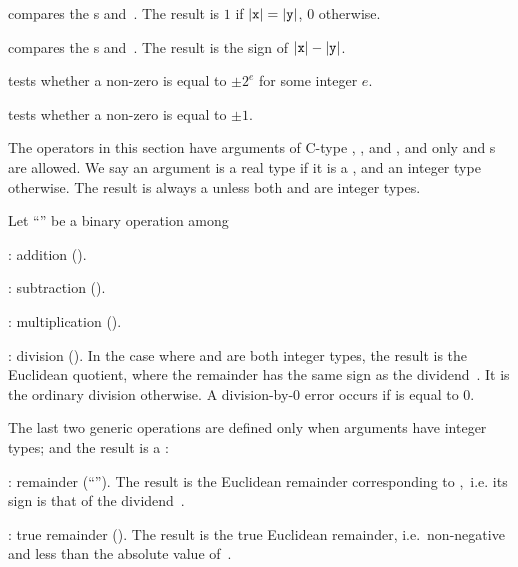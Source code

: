  compares the s 
and~. The result is $1$ if $|{\tt x}| = |{\tt y}|$, $0$ otherwise.

 compares the s  and~.
The result is the sign of $|{\tt x}| - |{\tt y}|$.

 tests whether a non-zero  
is equal to $\pm 2^e$ for some integer $e$.

 tests whether a non-zero  
is equal to $\pm 1$.

\label{se:genbinop} The operators in this
section have arguments of C-type , , and , and
only  and  s are allowed. We say an argument is a
real type if it is a  , and an integer type otherwise. The
result is always a  unless both  and  are integer
types.

Let ``\op'' be a binary operation among

\item {}: addition ().

\item {}: subtraction ().

\item {}: multiplication ().

\item {}: division (). In the case where  and 
are both integer types, the result is the Euclidean quotient, where the
remainder has the same sign as the dividend~. It is the ordinary
division otherwise. A division-by-$0$ error occurs if  is equal to
$0$.

The last two generic operations are defined only when arguments have integer
types; and the result is a :

\item {}: remainder (``''). The result is the Euclidean
remainder corresponding to ,~i.e. its sign is that of the
dividend~.

\item {}: true remainder (). The result is the true
Euclidean remainder, i.e.~non-negative and less than the absolute value
of~.

